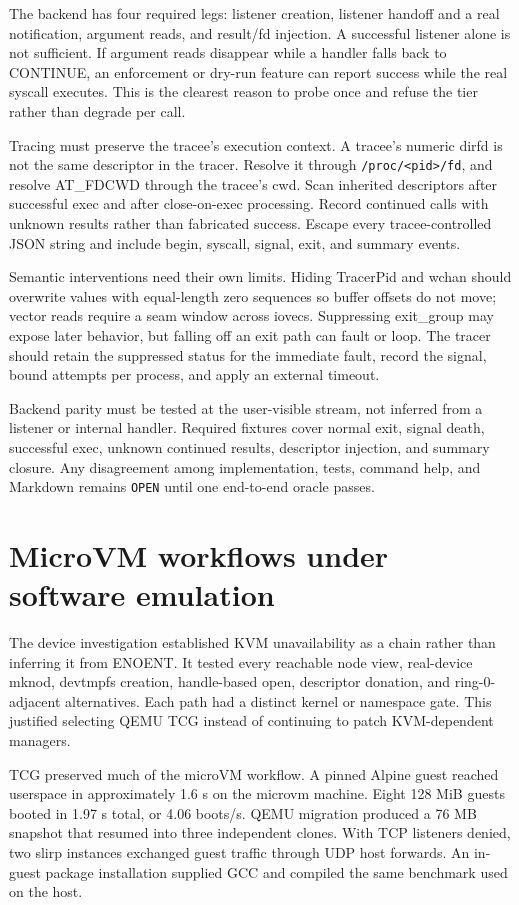 \documentclass[10pt,twocolumn]{article}
\begin{document}
The backend has four required legs: listener creation, listener handoff and a real notification, argument reads, and result/fd injection. A successful listener alone is not sufficient. If argument reads disappear while a handler falls back to CONTINUE, an enforcement or dry-run feature can report success while the real syscall executes. This is the clearest reason to probe once and refuse the tier rather than degrade per call.

Tracing must preserve the tracee's execution context. A tracee's numeric dirfd is not the same descriptor in the tracer. Resolve it through \texttt{/proc/<pid>/fd}, and resolve AT\_FDCWD through the tracee's cwd. Scan inherited descriptors after successful exec and after close-on-exec processing. Record continued calls with unknown results rather than fabricated success. Escape every tracee-controlled JSON string and include begin, syscall, signal, exit, and summary events.

Semantic interventions need their own limits. Hiding TracerPid and wchan should overwrite values with equal-length zero sequences so buffer offsets do not move; vector reads require a seam window across iovecs. Suppressing exit\_group may expose later behavior, but falling off an exit path can fault or loop. The tracer should retain the suppressed status for the immediate fault, record the signal, bound attempts per process, and apply an external timeout.

Backend parity must be tested at the user-visible stream, not inferred from a listener or internal handler. Required fixtures cover normal exit, signal death, successful exec, unknown continued results, descriptor injection, and summary closure. Any disagreement among implementation, tests, command help, and Markdown remains \texttt{OPEN} until one end-to-end oracle passes.

\section{MicroVM workflows under software emulation}
The device investigation established KVM unavailability as a chain rather than inferring it from ENOENT. It tested every reachable node view, real-device mknod, devtmpfs creation, handle-based open, descriptor donation, and ring-0-adjacent alternatives. Each path had a distinct kernel or namespace gate. This justified selecting QEMU TCG instead of continuing to patch KVM-dependent managers.

TCG preserved much of the microVM workflow. A pinned Alpine guest reached userspace in approximately 1.6 s on the microvm machine. Eight 128 MiB guests booted in 1.97 s total, or 4.06 boots/s. QEMU migration produced a 76 MB snapshot that resumed into three independent clones. With TCP listeners denied, two slirp instances exchanged guest traffic through UDP host forwards. An in-guest package installation supplied GCC and compiled the same benchmark used on the host.
\end{document}

